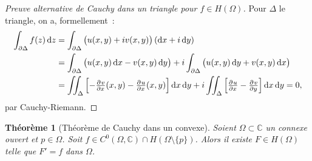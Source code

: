 \documentclass{report}
\newtheorem{thm}{Théorème}[chapter]
\theoremstyle{definition}
\theoremstyle{remark}
\numberwithin{equation}{section}
\newcommand{\C}{\mathbb C}
\begin{document}
				\begin{proof}[Preuve alternative de Cauchy dans un triangle pour $f \in H(\Omega)$] Pour $\Delta$ le triangle, on a, formellement~:
				\begin{align}
					\int_{\partial \Delta}f(z)\dif z &= \int_{\partial \Delta}\left(u(x, y) + iv(x, y)\right)\left(\dif x + i \dif y\right) \\
						&= \int_{\partial \Delta}\left(u(x, y)\dif x - v(x, y)\dif y\right) + i\int_{\partial\Delta}\left(u(x, y)\dif y + v(x, y)\dif x\right) \\
						&= \iint_\Delta \left[-\pd vx(x, y) - \pd ux(x, y)\right]\dif x\dif y + i\iint_\Delta\left[\pd ux - \pd vy\right]\dif x\dif y = 0,
				\end{align}
				par Cauchy-Riemann.
				\end{proof}

			\begin{thm}[Théorème de Cauchy dans un convexe] Soient $\Omega \subset \C$ un connexe ouvert et $p \in \Omega$.
			Soit $f \in C^0(\Omega, \C) \cap H(\Omega \setminus \{p\})$. Alors il existe $F \in H(\Omega)$ telle que $F' = f$ dans $\Omega$.
			\end{thm}
\end{document}
